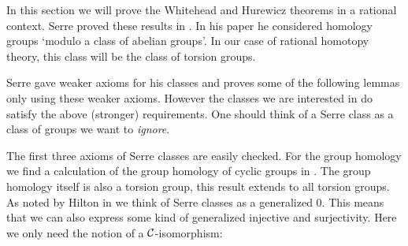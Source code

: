 

In this section we will prove the Whitehead and Hurewicz theorems in a rational context. Serre proved these results in \cite{serre}. In his paper he considered homology groups `modulo a class of abelian groups'. In our case of rational homotopy theory, this class will be the class of torsion groups.


Serre gave weaker axioms for his classes and proves some of the following lemmas only using these weaker axioms. However the classes we are interested in do satisfy the above (stronger) requirements. One should think of a Serre class as a class of groups we want to \emph{ignore}.


The first three axioms of Serre classes are easily checked. For the group homology we find a calculation of the group homology of cyclic groups in \cite{moerdijk}. The group homology itself is also a torsion group, this result extends to all torsion groups. As noted by Hilton in \cite{hilton} we think of Serre classes as a generalized 0. This means that we can also express some kind of generalized injective and surjectivity. Here we only need the notion of a $\mathcal{C}$-isomorphism:

